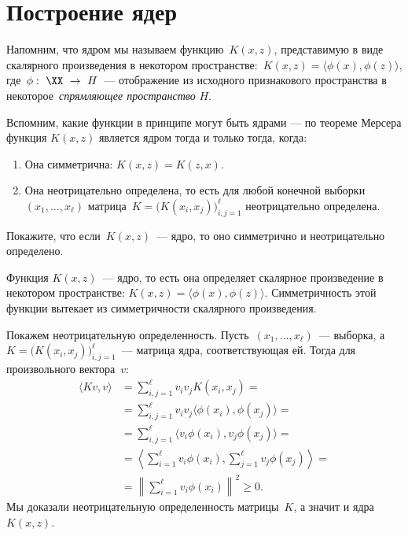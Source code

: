 \documentclass[12pt,fleqn]{article}
\begin{document}
\section{Построение ядер}

Напомним, что ядром мы называем функцию~$K(x, z)$,
представимую в виде скалярного произведения в некотором
пространстве:~$K(x, z) = \langle \phi(x), \phi(z) \rangle$,
где~$\phi:~\XX~\to~H$~--- отображение из исходного признакового пространства
в некоторое~\emph{спрямляющее пространство} $H$. 

Вспомним, какие функции в принципе могут быть ядрами --- по теореме Мерсера 
функция $K(x, z)$ является ядром тогда и только тогда, когда:
\begin{enumerate}
	\item Она симметрична: $K(x, z) = K(z, x)$.
	\item Она неотрицательно определена, то есть для
	любой конечной выборки~$(x_1, \dots, x_\ell)$
	матрица~$K = \bigl( K(x_i, x_j) \bigr)_{i, j = 1}^{\ell}$
	неотрицательно определена.
\end{enumerate}

\begin{vkProblem}
	Покажите, что если~$K(x, z)$~--- ядро, то оно симметрично
	и неотрицательно определено.
\end{vkProblem}

\begin{esSolution}
	Функция $K(x, z)$~--- ядро, то есть она определяет скалярное произведение
	в некотором пространстве: $K(x, z) = \langle \phi(x), \phi(z) \rangle$.
	Симметричность этой функции вытекает из симметричности скалярного 
	произведения.
	
	Покажем неотрицательную определенность.
	Пусть~$(x_1, \dots, x_\ell)$~--- выборка,
	а~$K = \bigl( K(x_i, x_j) \bigr)_{i, j = 1}^{\ell}$~--- матрица ядра,
	соответствующая ей.
	Тогда для произвольного вектора~$v$:
	\begin{align*}
		\langle K v, v \rangle
		&=
		\sum_{i, j = 1}^{\ell} v_i v_j K(x_i, x_j)
		=\\
		&=
		\sum_{i, j = 1}^{\ell} v_i v_j \langle \phi(x_i), \phi(x_j) \rangle
		=\\
		&=
		\sum_{i, j = 1}^{\ell} \langle v_i \phi(x_i), v_j \phi(x_j) \rangle
		=\\
		&=
		\left\langle
		\sum_{i = 1}^{\ell} v_i \phi(x_i), \sum_{j = 1}^{\ell} v_j \phi(x_j)
		\right\rangle
		=\\
		&=
		\left\|
		\sum_{i = 1}^{\ell} v_i \phi(x_i)
		\right\|^2
		\geq 0.
	\end{align*}
	Мы доказали неотрицательную определенность матрицы~$K$,
	а значит и ядра~$K(x, z)$.
\end{esSolution}
\end{document}
